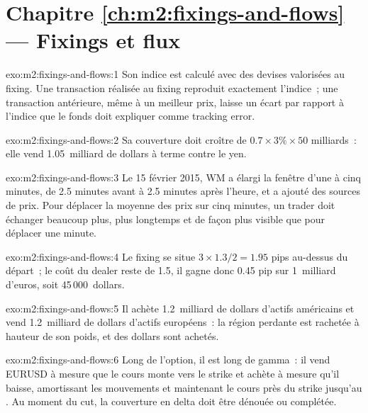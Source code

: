 \section*{Chapitre \ref{ch:m2:fixings-and-flows} --- Fixings et flux}

\begin{solution}{exo:m2:fixings-and-flows:1}
Son indice est calculé avec des devises valorisées au fixing. Une transaction réalisée au fixing
reproduit exactement l'indice~; une transaction antérieure, même à un meilleur prix, laisse un
écart par rapport à l'indice que le fonds doit expliquer comme tracking error.
\end{solution}

\begin{solution}{exo:m2:fixings-and-flows:2}
Sa couverture doit croître de $0.7 \times 3\% \times 50$ milliards~: elle vend
1.05~milliard de dollars à terme contre le yen.
\end{solution}

\begin{solution}{exo:m2:fixings-and-flows:3}
Le 15 février 2015, WM a élargi la fenêtre d'une à cinq minutes, de 2.5
minutes avant à 2.5 minutes après l'heure, et a ajouté des sources de prix. Pour déplacer
la moyenne des prix sur cinq minutes, un trader doit échanger beaucoup plus, plus longtemps et
de façon plus visible que pour déplacer une minute.
\end{solution}

\begin{solution}{exo:m2:fixings-and-flows:4}
Le fixing se situe $3 \times 1.3/2 = 1.95$ pips au-dessus du départ~; le coût du dealer reste
de 1.5, il gagne donc 0.45 pip sur 1~milliard d'euros, soit 45\,000~dollars.
\end{solution}

\begin{solution}{exo:m2:fixings-and-flows:5}
Il achète 1.2~milliard de dollars d'actifs américains et vend 1.2~milliard de dollars d'actifs
européens~: la région perdante est rachetée à hauteur de son poids, et des dollars sont achetés.
\end{solution}

\begin{solution}{exo:m2:fixings-and-flows:6}
Long de l'option, il est long de gamma~: il vend EURUSD à mesure que le cours monte vers le
strike et achète à mesure qu'il baisse, amortissant les mouvements et maintenant le cours près du strike
jusqu'au . Au moment du cut, la couverture en delta doit être dénouée ou complétée.
\end{solution}

